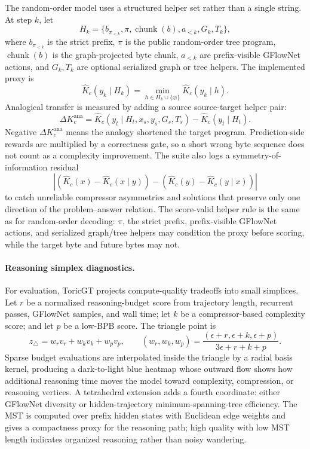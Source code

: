 \documentclass[10pt]{article}
\theoremstyle{definition}
\theoremstyle{plain}
\theoremstyle{remark}
\begin{document}
The random-order model uses a structured helper set rather than a single string.  At step $k$, let
\begin{equation}
  H_k=\{b_{\pi_{<k}},\pi,\operatorname{chunk}(b),a_{<k},G_k,T_k\},
\end{equation}
where $b_{\pi_{<k}}$ is the strict prefix, $\pi$ is the public random-order tree program, $\operatorname{chunk}(b)$ is the graph-projected byte chunk, $a_{<k}$ are prefix-visible GFlowNet actions, and $G_k,T_k$ are optional serialized graph or tree helpers.  The implemented proxy is
\begin{equation}
  \widehat K_c(y_k\mid H_k)=\min_{h\in H_k\cup\{\varnothing\}}\widehat K_c(y_k\mid h).
\end{equation}
Analogical transfer is measured by adding a source source-target helper pair:
\begin{equation}
  \Delta K_c^{\mathrm{ana}}=
  \widehat K_c(y_t\mid H_t,x_s,y_s,G_s,T_s)
  -\widehat K_c(y_t\mid H_t).
\end{equation}
Negative $\Delta K_c^{\mathrm{ana}}$ means the analogy shortened the target program.  Prediction-side rewards are multiplied by a correctness gate, so a short wrong byte sequence does not count as a complexity improvement.  The suite also logs a symmetry-of-information residual
\begin{equation}
  \left|(\widehat K_c(x)-\widehat K_c(x\mid y))-(\widehat K_c(y)-\widehat K_c(y\mid x))\right|
\end{equation}
to catch unreliable compressor asymmetries and solutions that preserve only one direction of the problem--answer relation.  The score-valid helper rule is the same as for random-order decoding: $\pi$, the strict prefix, prefix-visible GFlowNet actions, and serialized graph/tree helpers may condition the proxy before scoring, while the target byte and future bytes may not.

\paragraph{Reasoning simplex diagnostics.}
For evaluation, ToricGT projects compute-quality tradeoffs into small simplices.  Let $r$ be a normalized reasoning-budget score from trajectory length, recurrent passes, GFlowNet samples, and wall time; let $k$ be a compressor-based complexity score; and let $p$ be a low-BPB score.  The triangle point is
\begin{equation}
  z_{\triangle}=w_r v_r+w_k v_k+w_p v_p,\qquad
  (w_r,w_k,w_p)=\frac{(\epsilon+r,\epsilon+k,\epsilon+p)}
  {3\epsilon+r+k+p}.
\end{equation}
Sparse budget evaluations are interpolated inside the triangle by a radial basis kernel, producing a dark-to-light blue heatmap whose outward flow shows how additional reasoning time moves the model toward complexity, compression, or reasoning vertices.  A tetrahedral extension adds a fourth coordinate: either GFlowNet diversity or hidden-trajectory minimum-spanning-tree efficiency.  The MST is computed over prefix hidden states with Euclidean edge weights and gives a compactness proxy for the reasoning path; high quality with low MST length indicates organized reasoning rather than noisy wandering.
\end{document}

